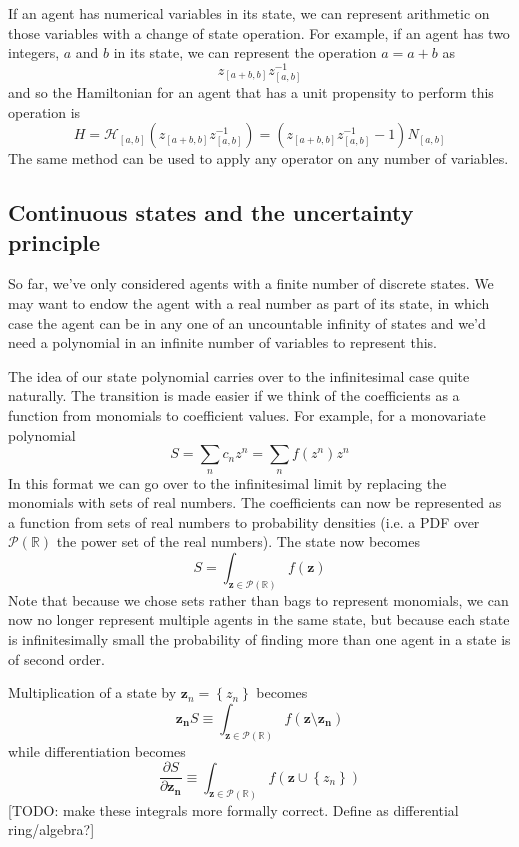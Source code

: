 \documentclass[letterpaper,twocolumn,10pt]{article}
\begin{document}
If an agent has numerical variables in its state, we can represent arithmetic on those variables with a change of state operation. For example, if an agent has two integers, $a$ and $b$ in its state, we can represent the operation $a = a + b$ as
\[
z_{[a+b,b]}z_{[a,b]}^{-1}
\]
and so the Hamiltonian for an agent that has a unit propensity to perform this operation is
\[
H = \mathcal{H}_{[a,b]}(z_{[a+b,b]}z_{[a,b]}^{-1}) = (z_{[a+b,b]}z_{[a,b]}^{-1}-1)N_{[a,b]}
\]
The same method can be used to apply any operator on any number of variables.

\subsection{Continuous states and the uncertainty principle}

So far, we've only considered agents with a finite number of discrete states. We may want to endow the agent with a real number as part of its state, in which case the agent can be in any one of an uncountable infinity of states and we'd need a polynomial in an infinite number of variables to represent this.

The idea of our state polynomial carries over to the infinitesimal case quite naturally. The transition is made easier if we think of the coefficients as a function from monomials to coefficient values. For example, for a monovariate polynomial
\[
S = \sum_n c_n z^n = \sum_n f(z^n)z^n 
\]
In this format we can go over to the infinitesimal limit by replacing the monomials with sets of real numbers. The coefficients can now be represented as a function from sets of real numbers to probability densities (i.e. a PDF over $\mathcal{P}(\mathbb{R})$ the power set of the real numbers). The state now becomes
\[
S = \int_{\mathbf{z} \in \mathcal{P}(\mathbb{R})} f(\mathbf{z})
\]
Note that because we chose sets rather than bags to represent monomials, we can now no longer represent multiple agents in the same state, but because each state is infinitesimally small the probability of finding more than one agent in a state is of second order.

Multiplication of a state by $\mathbf{z}_n = \left\{z_n\right\}$ becomes
\[
\mathbf{z_n}S \equiv \int_{\mathbf{z} \in \mathcal{P}(\mathbb{R})} f(\mathbf{z} \setminus\mathbf{z_n})
\]
while differentiation becomes
\[
\frac{\partial S}{\partial \mathbf{z_n}}  \equiv \int_{\mathbf{z} \in \mathcal{P}(\mathbb{R})} f(\mathbf{z} \cup \left\{z_n\right\})
\]
[TODO: make these integrals more formally correct. Define as differential ring/algebra?]
\end{document}
